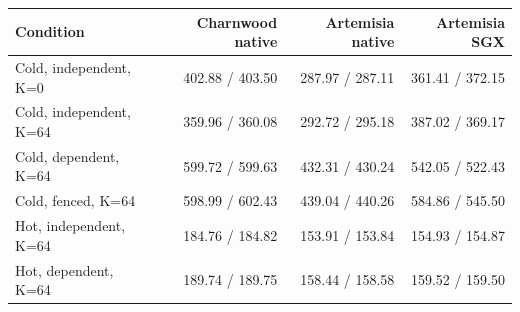 \begin{tabular}{lrrr}
\toprule
Condition & Charnwood native & Artemisia native & Artemisia SGX \\
\midrule
Cold, independent, K=0 & 402.88 / 403.50 & 287.97 / 287.11 & 361.41 / 372.15 \\
Cold, independent, K=64 & 359.96 / 360.08 & 292.72 / 295.18 & 387.02 / 369.17 \\
Cold, dependent, K=64 & 599.72 / 599.63 & 432.31 / 430.24 & 542.05 / 522.43 \\
Cold, fenced, K=64 & 598.99 / 602.43 & 439.04 / 440.26 & 584.86 / 545.50 \\
Hot, independent, K=64 & 184.76 / 184.82 & 153.91 / 153.84 & 154.93 / 154.87 \\
Hot, dependent, K=64 & 189.74 / 189.75 & 158.44 / 158.58 & 159.52 / 159.50 \\
\bottomrule
\end{tabular}
